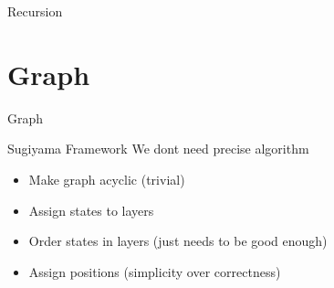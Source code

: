 \begin{frame}{Recursion}
    
    
\end{frame}

\section{Graph}
\begin{frame}[shrink=5]{Graph}
    \begin{center}
        
    \end{center}
\end{frame}
\begin{frame}{Sugiyama Framework}
    We dont need precise algorithm
    \begin{itemize}
        \item Make graph acyclic (trivial)
        \item Assign states to layers
        \item Order states in layers (just needs to be good enough)
        \item Assign positions (simplicity over correctness)
    \end{itemize}
\end{frame}

